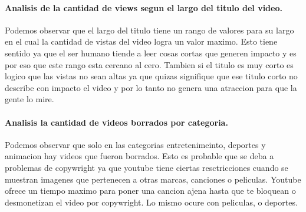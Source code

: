         \paragraph{Analisis de la cantidad de views segun el largo del titulo del video.}

            \begin{figure}[ht]
            \end{figure}
        \FloatBarrier
        Podemos observar que el largo del titulo tiene un rango de valores para
        su largo en el cual la cantidad de vistas del video logra un valor maximo.
        Esto tiene sentido ya que el ser humano tiende a leer cosas cortas que
        generen impacto y es por eso que este rango esta cercano al cero. Tambien
        si el titulo es muy corto es logico que las vistas no sean altas ya que quizas
        signifique que ese titulo corto no describe con impacto el video y por lo tanto
        no genera una atraccion para que la gente lo mire.
        \newpage

        \paragraph{Analisis la cantidad de videos borrados por categoria.}

            \begin{figure}[ht]
            \end{figure}
        \FloatBarrier
        Podemos observar que solo en las categorias entretenimeinto, deportes y
        animacion hay videos que fueron borrados. Esto es probable que se deba a
        problemas de copywright ya que youtube tiene ciertas resctricciones cuando
        se muestran imagenes que pertenecen a otras marcas, canciones o peliculas.
        Youtube ofrece un tiempo maximo para poner una cancion ajena hasta que te
        bloquean o desmonetizan el video por copywright. Lo mismo ocure con peliculas,
        o deportes.
        \newpage

